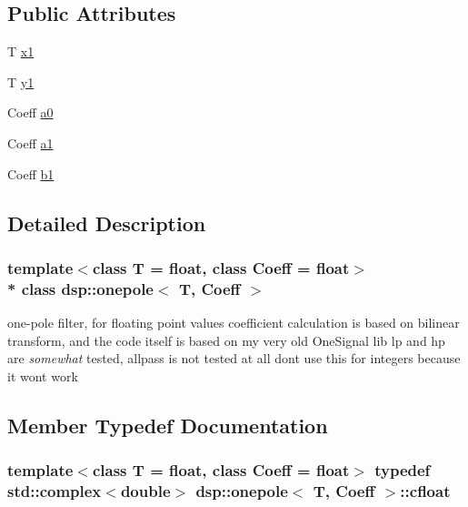 \subsection*{Public Attributes}
\begin{DoxyCompactItemize}
\item 
T \hyperlink{classdsp_1_1onepole_a43750f73796581da8310aa56fc0914a8}{x1}
\item 
T \hyperlink{classdsp_1_1onepole_a4de5f5e37475dfa0b6a3f44827bb1272}{y1}
\item 
Coeff \hyperlink{classdsp_1_1onepole_add0620a77694639de6532365beb0c73c}{a0}
\item 
Coeff \hyperlink{classdsp_1_1onepole_a43906c356c0006dfbf32d7b989749767}{a1}
\item 
Coeff \hyperlink{classdsp_1_1onepole_afcd7b74b224a81a705f6824df2d55351}{b1}
\end{DoxyCompactItemize}


\subsection{Detailed Description}
\subsubsection*{template$<$class T = float, class Coeff = float$>$\\*
class dsp\+::onepole$<$ T, Coeff $>$}

one-\/pole filter, for floating point values coefficient calculation is based on bilinear transform, and the code itself is based on my very old One\+Signal lib lp and hp are {\itshape somewhat} tested, allpass is not tested at all don\textquotesingle{}t use this for integers because it won\textquotesingle{}t work 

\subsection{Member Typedef Documentation}
\subsubsection[{\texorpdfstring{cfloat}{cfloat}}]{\setlength{\rightskip}{0pt plus 5cm}template$<$class T = float, class Coeff = float$>$ typedef std\+::complex$<$double$>$ {\bf dsp\+::onepole}$<$ T, Coeff $>$\+::{\bf cfloat}}\hypertarget{classdsp_1_1onepole_aa3ec578cfbf7c9821819c7fb6fef5bfb}{}\label{classdsp_1_1onepole_aa3ec578cfbf7c9821819c7fb6fef5bfb}


